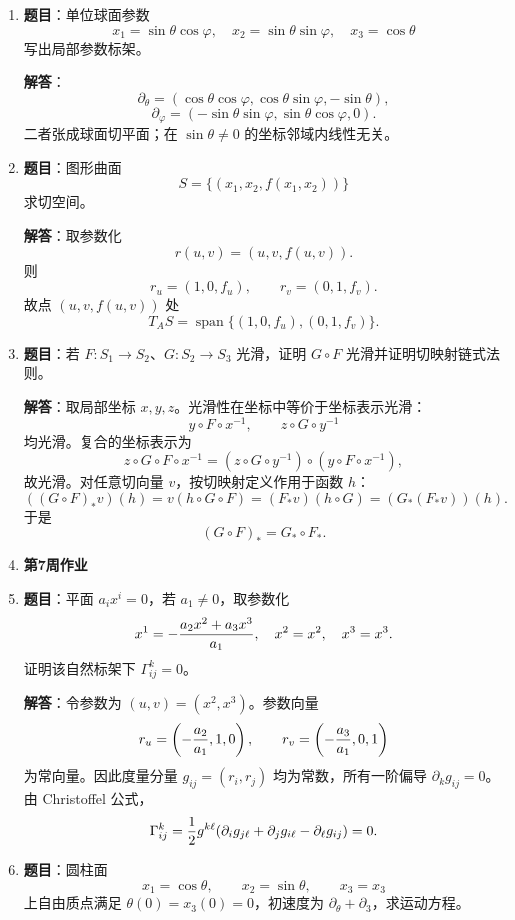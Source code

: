 \documentclass[UTF8,12pt,a4paper]{ctexart}
\newcommand{\inner}[2]{\left(#1,#2\right)}
\newcommand{\spn}{\operatorname{span}}
\newcommand{\homeworkweek}[1]{%
  \item[]\vspace{0.35em}\noindent\textbf{\large #1}\vspace{0.15em}
}
\begin{document}
\begin{enumerate}
\textbf{解答}：定义中 $\partial_u f$ 是 $f$ 沿参数曲线的方向导数。方向导数对函数线性：
\[
\partial_u(af+bg)=a\partial_u f+b\partial_u g.
\]
又由一元函数乘积求导法则，
\[
\partial_u(fg)=f(A)\partial_u g+g(A)\partial_u f.
\]
这正是导算子的线性性与 Leibniz 法则，所以 $\partial_u$ 是 $A$ 处导算子。

\item \textbf{题目}：单位球面参数
\[
x_1=\sin\theta\cos\varphi,\quad x_2=\sin\theta\sin\varphi,\quad x_3=\cos\theta
\]
写出局部参数标架。

\textbf{解答}：
\[
\boxed{\partial_\theta=(\cos\theta\cos\varphi,\cos\theta\sin\varphi,-\sin\theta),}
\]
\[
\boxed{\partial_\varphi=(-\sin\theta\sin\varphi,\sin\theta\cos\varphi,0).}
\]
二者张成球面切平面；在 $\sin\theta\ne0$ 的坐标邻域内线性无关。

\item \textbf{题目}：图形曲面
\[
S=\{(x_1,x_2,f(x_1,x_2))\}
\]
求切空间。

\textbf{解答}：取参数化
\[
r(u,v)=(u,v,f(u,v)).
\]
则
\[
r_u=(1,0,f_u),\qquad r_v=(0,1,f_v).
\]
故点 $(u,v,f(u,v))$ 处
\[
\boxed{T_AS=\spn\{(1,0,f_u),(0,1,f_v)\}.}
\]

\item \textbf{题目}：若 $F:S_1\to S_2$、$G:S_2\to S_3$ 光滑，证明 $G\circ F$ 光滑并证明切映射链式法则。

\textbf{解答}：取局部坐标 $x,y,z$。光滑性在坐标中等价于坐标表示光滑：
\[
y\circ F\circ x^{-1},\qquad z\circ G\circ y^{-1}
\]
均光滑。复合的坐标表示为
\[
z\circ G\circ F\circ x^{-1}
=(z\circ G\circ y^{-1})\circ(y\circ F\circ x^{-1}),
\]
故光滑。对任意切向量 $v$，按切映射定义作用于函数 $h$：
\[
((G\circ F)_*v)(h)=v(h\circ G\circ F)
=(F_*v)(h\circ G)=(G_*(F_*v))(h).
\]
于是
\[
\boxed{(G\circ F)_*=G_*\circ F_*.}
\]

\homeworkweek{第7周作业}
\item \textbf{题目}：平面 $a_ix^i=0$，若 $a_1\ne0$，取参数化
\[
x^1=-{a_2x^2+a_3x^3\over a_1},\quad x^2=x^2,\quad x^3=x^3.
\]
证明该自然标架下 $\Gamma^k_{ij}=0$。

\textbf{解答}：令参数为 $(u,v)=(x^2,x^3)$。参数向量
\[
r_u=\left(-{a_2\over a_1},1,0\right),\qquad
r_v=\left(-{a_3\over a_1},0,1\right)
\]
为常向量。因此度量分量 $g_{ij}=\inner{r_i}{r_j}$ 均为常数，所有一阶偏导 $\partial_k g_{ij}=0$。由 Christoffel 公式，
\[
\Gamma^k_{ij}={1\over2}g^{k\ell}(\partial_i g_{j\ell}+\partial_j g_{i\ell}-\partial_\ell g_{ij})=0.
\]

\item \textbf{题目}：圆柱面
\[
x_1=\cos\theta,\qquad x_2=\sin\theta,\qquad x_3=x_3
\]
上自由质点满足 $\theta(0)=x_3(0)=0$，初速度为 $\partial_\theta+\partial_3$，求运动方程。


\end{enumerate}
\end{document}
